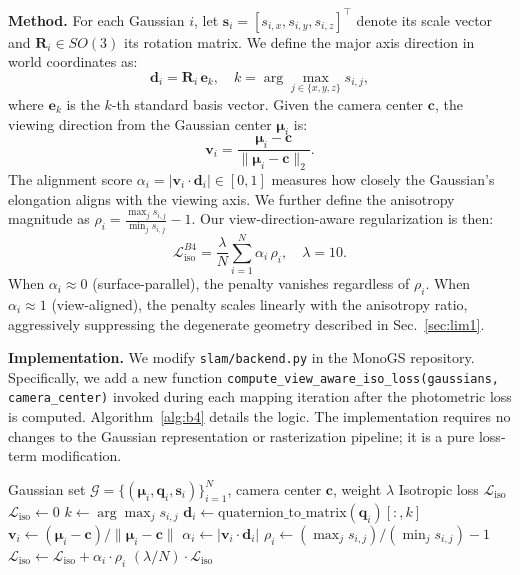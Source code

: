 \documentclass[conference]{IEEEtran}
\begin{document}
\textbf{Method.}
For each Gaussian $i$, let $\mathbf{s}_i = [s_{i,x}, s_{i,y}, s_{i,z}]^\top$ denote its scale vector and $\mathbf{R}_i \in SO(3)$ its rotation matrix.
We define the major axis direction in world coordinates as:
\begin{equation}
\mathbf{d}_i = \mathbf{R}_i \, \mathbf{e}_{k}, \quad k = \arg\max_{j \in \{x,y,z\}} s_{i,j},
\end{equation}
where $\mathbf{e}_k$ is the $k$-th standard basis vector.
Given the camera center $\mathbf{c}$, the viewing direction from the Gaussian center $\boldsymbol{\mu}_i$ is:
\begin{equation}
\mathbf{v}_i = \frac{\boldsymbol{\mu}_i - \mathbf{c}}{\|\boldsymbol{\mu}_i - \mathbf{c}\|_2}.
\end{equation}
The alignment score $\alpha_i = |\mathbf{v}_i \cdot \mathbf{d}_i| \in [0, 1]$ measures how closely the Gaussian's elongation aligns with the viewing axis.
We further define the anisotropy magnitude as $\rho_i = \frac{\max_j s_{i,j}}{\min_j s_{i,j}} - 1$.
Our view-direction-aware regularization is then:
\begin{equation}
\mathcal{L}_{\text{iso}}^{{B4}} = \frac{\lambda}{N} \sum_{i=1}^{N} \alpha_i \, \rho_i, \quad \lambda = 10.
\label{eq:iso_b4}
\end{equation}
When $\alpha_i \approx 0$ (surface-parallel), the penalty vanishes regardless of $\rho_i$.
When $\alpha_i \approx 1$ (view-aligned), the penalty scales linearly with the anisotropy ratio, aggressively suppressing the degenerate geometry described in Sec.~\ref{sec:lim1}.

\textbf{Implementation.}
We modify \texttt{slam/backend.py} in the MonoGS repository.
Specifically, we add a new function \texttt{compute\_view\_aware\_iso\_loss(gaussians, camera\_center)} invoked during each mapping iteration after the photometric loss is computed.
Algorithm~\ref{alg:b4} details the logic.
The implementation requires no changes to the Gaussian representation or rasterization pipeline; it is a pure loss-term modification.

\begin{algorithm}[t]
\caption{View-Direction-Aware Isotropic Loss}
\label{alg:b4}
\begin{algorithmic}
\REQUIRE Gaussian set $\mathcal{G} = \{(\boldsymbol{\mu}_i, \mathbf{q}_i, \mathbf{s}_i)\}_{i=1}^N$, camera center $\mathbf{c}$, weight $\lambda$
\ENSURE Isotropic loss $\mathcal{L}_{\text{iso}}$
\STATE $\mathcal{L}_{\text{iso}} \gets 0$
    \STATE $k \gets \arg\max_j s_{i,j}$
    \STATE $\mathbf{d}_i \gets \text{quaternion\_to\_matrix}(\mathbf{q}_i)[:, k]$ 
    \STATE $\mathbf{v}_i \gets (\boldsymbol{\mu}_i - \mathbf{c}) / \|\boldsymbol{\mu}_i - \mathbf{c}\|$
    \STATE $\alpha_i \gets |\mathbf{v}_i \cdot \mathbf{d}_i|$
    \STATE $\rho_i \gets (\max_j s_{i,j}) / (\min_j s_{i,j}) - 1$
    \STATE $\mathcal{L}_{\text{iso}} \gets \mathcal{L}_{\text{iso}} + \alpha_i \cdot \rho_i$
\ENDFOR
\STATE \RETURN $(\lambda / N) \cdot \mathcal{L}_{\text{iso}}$
\end{algorithmic}
\end{algorithm}
\end{document}
